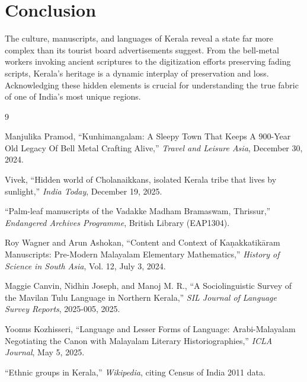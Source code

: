 \documentclass[12pt]{article}
\begin{document}
\section*{Conclusion}
The culture, manuscripts, and languages of Kerala reveal a state far more complex than its tourist board advertisements suggest. From the bell-metal workers invoking ancient scriptures to the digitization efforts preserving fading scripts, Kerala's heritage is a dynamic interplay of preservation and loss. Acknowledging these hidden elements is crucial for understanding the true fabric of one of India's most unique regions.


\begin{thebibliography}{9}

Manjulika Pramod, “Kunhimangalam: A Sleepy Town That Keeps A 900-Year Old Legacy Of Bell Metal Crafting Alive,” \textit{Travel and Leisure Asia}, December 30, 2024.

Vivek, “Hidden world of Cholanaikkans, isolated Kerala tribe that lives by sunlight,” \textit{India Today}, December 19, 2025.

“Palm-leaf manuscripts of the Vadakke Madham Bramaswam, Thrissur,” \textit{Endangered Archives Programme}, British Library (EAP1304).

Roy Wagner and Arun Ashokan, “Content and Context of Kaṇakkatikāram Manuscripts: Pre-Modern Malayalam Elementary Mathematics,” \textit{History of Science in South Asia}, Vol. 12, July 3, 2024.

Maggie Canvin, Nidhin Joseph, and Manoj M. R., “A Sociolinguistic Survey of the Mavilan Tulu Language in Northern Kerala,” \textit{SIL Journal of Language Survey Reports}, 2025-005, 2025.

Yoonus Kozhisseri, “Language and Lesser Forms of Language: Arabi-Malayalam Negotiating the Canon with Malayalam Literary Historiographies,” \textit{ICLA Journal}, May 5, 2025.

“Ethnic groups in Kerala,” \textit{Wikipedia}, citing Census of India 2011 data.

\end{thebibliography}
\end{document}
